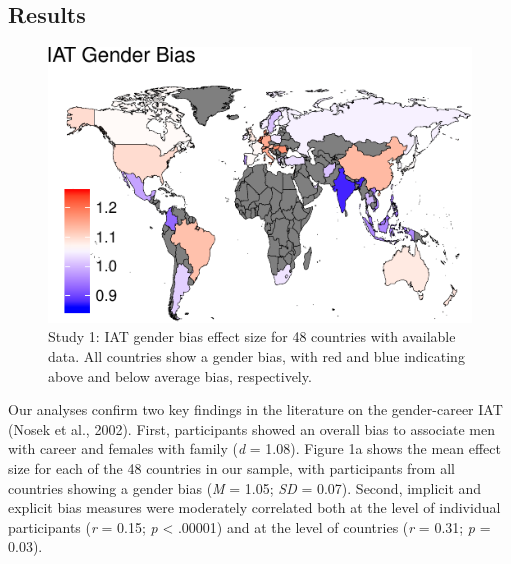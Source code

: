 \documentclass[10pt, letterpaper]{article}
\newenvironment{CodeChunk}{}{}
\begin{document}
\subsection{Results}\label{results}

\begin{CodeChunk}
\begin{figure}[t]

{\centering \includegraphics{figs/country_gender_bias_map-1} 

}

\caption[Study 1]{Study 1: IAT gender bias effect size for 48 countries with available data. All countries show a gender bias, with red and blue indicating above and below average bias, respectively.}\label{fig:country_gender_bias_map}
\end{figure}
\end{CodeChunk}

Our analyses confirm two key findings in the literature on the
gender-career IAT (Nosek et al., 2002). First, participants showed an
overall bias to associate men with career and females with family
(\emph{d} = 1.08). Figure 1a shows the mean effect size for each of the
48 countries in our sample, with participants from all countries showing
a gender bias (\emph{M} = 1.05; \emph{SD} = 0.07). Second, implicit and
explicit bias measures were moderately correlated both at the level of
individual participants (\emph{r} = 0.15; \emph{p} \textless{} .00001)
and at the level of countries (\emph{r} = 0.31; \emph{p} = 0.03).
\end{document}
